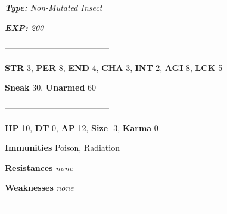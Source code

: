 \documentclass[11pt,a4paper,twocolumn]{book}
\begin{document}
	\noindent
	\emph{\textbf{Type:} Non-Mutated Insect}
	
	\noindent
	\emph{\textbf{EXP:} 200}
	
%		
%	
%		

	--------------------------------------

	\noindent
	\textbf{STR} 3, \textbf{PER} 8, \textbf{END} 4, \textbf{CHA} 3, \textbf{INT} 2, \textbf{AGI} 8, \textbf{LCK} 5
	
	\noindent
	\textbf{Sneak} 30, \textbf{Unarmed} 60
	
	--------------------------------------
	
	\noindent
	\textbf{HP} 10, \textbf{DT} 0, \textbf{AP} 12, \textbf{Size} -3, \textbf{Karma} 0
	
	
	\noindent
	\textbf{Immunities} Poison, Radiation
	
	\noindent
	\textbf{Resistances} \emph{none} %
	
	\noindent
	\textbf{Weaknesses} \emph{none} %
	
	--------------------------------------
	
\end{document}
